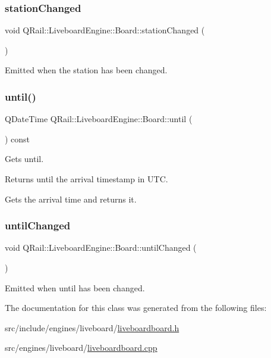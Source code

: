 \subsubsection{\texorpdfstring{stationChanged}{stationChanged}}
{\footnotesize\ttfamily void Q\+Rail\+::\+Liveboard\+Engine\+::\+Board\+::station\+Changed (\begin{DoxyParamCaption}{ }\end{DoxyParamCaption})\hspace{0.3cm}{\ttfamily [signal]}}



Emitted when the station has been changed. 

\mbox{\label{classQRail_1_1LiveboardEngine_1_1Board_af09d8cddaaf92ba4a3a5d74ee393388b}} 
\subsubsection{\texorpdfstring{until()}{until()}}
{\footnotesize\ttfamily Q\+Date\+Time Q\+Rail\+::\+Liveboard\+Engine\+::\+Board\+::until (\begin{DoxyParamCaption}{ }\end{DoxyParamCaption}) const}



Gets until. 

\begin{DoxyReturn}{Returns}
until the arrival timestamp in U\+TC.
\end{DoxyReturn}
Gets the arrival time and returns it. \mbox{\label{classQRail_1_1LiveboardEngine_1_1Board_aa2d6f92cc84b2f68d7870f514e6267ef}} 
\subsubsection{\texorpdfstring{untilChanged}{untilChanged}}
{\footnotesize\ttfamily void Q\+Rail\+::\+Liveboard\+Engine\+::\+Board\+::until\+Changed (\begin{DoxyParamCaption}{ }\end{DoxyParamCaption})\hspace{0.3cm}{\ttfamily [signal]}}



Emitted when until has been changed. 



The documentation for this class was generated from the following files\+:\begin{DoxyCompactItemize}
\item 
src/include/engines/liveboard/\mbox{\hyperlink{liveboardboard_8h}{liveboardboard.\+h}}\item 
src/engines/liveboard/\mbox{\hyperlink{liveboardboard_8cpp}{liveboardboard.\+cpp}}\end{DoxyCompactItemize}
